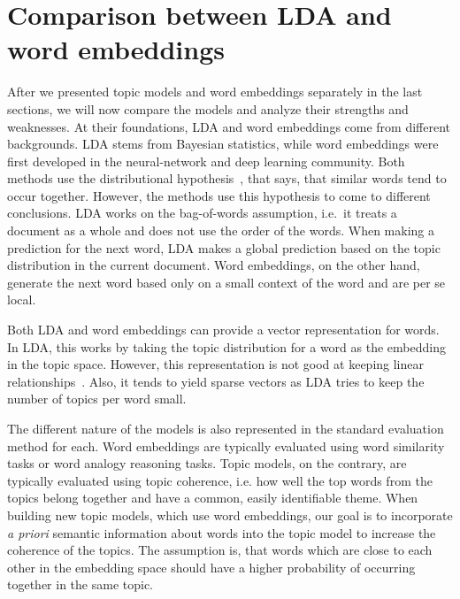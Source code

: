 \documentclass[
        a4paper,
        titlepage,
        twoside,
        parskip,
        numbers=noenddot
        ]{scrbook}
\theoremstyle{break}
\begin{document}
\section{Comparison between LDA and word embeddings}

After we presented topic models and word embeddings separately in the last sections, we will now compare the models and analyze their strengths and weaknesses.
At their foundations, LDA and word embeddings come from different backgrounds.
LDA stems from Bayesian statistics, while word embeddings were first developed in the neural-network and deep learning community.
Both methods use the distributional hypothesis~\cite{Firth1957}, that says, that similar words tend to occur together.
However, the methods use this hypothesis to come to different conclusions.
LDA works on the bag-of-words assumption, i.e.\ it treats a document as a whole and does not use the order of the words.
When making a prediction for the next word, LDA makes a global prediction based on the topic distribution in the current document.
Word embeddings, on the other hand, generate the next word based only on a small context of the word and are per se local.

Both LDA and word embeddings can provide a vector representation for words.
In LDA, this works by taking the topic distribution for a word as the embedding in the topic space.
However, this representation is not good at keeping linear relationships~\cite{Mikolov2013b,Mikolov2013a}.
Also, it tends to yield sparse vectors as LDA tries to keep the number of topics per word small.

The different nature of the models is also represented in the standard evaluation method for each.
Word embeddings are typically evaluated using word similarity tasks or word analogy reasoning tasks.
Topic models, on the contrary, are typically evaluated using topic coherence, i.e. how well the top words from the topics belong together and have a common, easily identifiable theme.
When building new topic models, which use word embeddings, our goal is to incorporate \emph{a priori} semantic information about words into the topic model to increase the coherence of the topics.
The assumption is, that words which are close to each other in the embedding space should have a higher probability of occurring together in the same topic.
\end{document}

